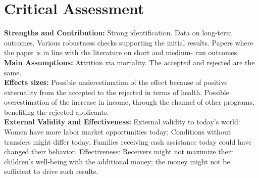 \section{Critical Assessment}
\textbf{Strengths and Contribution:} Strong identification. Data on long-term outcomes. Various robustness checks supporting the initial results. Papers where the paper is in line with the literature on short and medium- run outcomes.\\
\textbf{Main Assumptions:} Attrition via mortality. The accepted and rejected are the same. \\
\textbf{Effects sizes:} Possible underestimation of the effect because of positive
externality from the accepted to the rejected in terms of health. Possible overestimation of the increase in income, through the
channel of other programs, benefiting the rejected applicants.\\
\textbf{External Validity and Effectiveness:} External validity to today's world: Women have more labor market
opportunities today; Conditions without transfers might differ today;
Families receiving cash assistance today could have changed their
behavior. Effectiveness: Receivers might not maximize their children's
well-being with the additional money; the money might not be sufficient
to drive such results.
